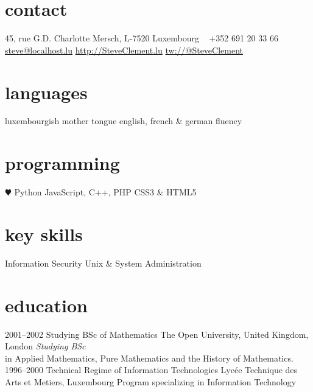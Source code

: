 \documentclass[]{friggeri-cv} %
\begin{document}


\begin{aside} %
\section{contact}
45, rue G.D. Charlotte
Mersch, L-7520
Luxembourg
~
+352 691 20 33 66
~
\href{mailto:steve@localhost.lu}{steve@localhost.lu}
\href{http://www.SteveClement.lu}{http://SteveClement.lu}
\href{http://twitter.com/SteveClement}{tw://@SteveClement}
\section{languages}
luxembourgish mother tongue
english, french \& german fluency
\section{programming}
{\color{red} $\varheartsuit$} Python
JavaScript, C++, PHP
CSS3 \& HTML5
\section{key skills}
Information Security
Unix \& System Administration
\end{aside}


\section{education}

\begin{entrylist}
\entry
{2001--2002}
{Studying BSc {\normalfont of Mathematics}}
{The Open University, United Kingdom, London}
{\emph{Studying BSc} \\ in Applied Mathematics, Pure Mathematics and the History of Mathematics.}
\entry
{1996--2000}
{Technical Regime {\normalfont of Information Technologies}}
{Lyc\'{e}e Technique des Arts et Metiers, Luxembourg}
{Program specializing in Information Technology}

\end{entrylist}
\end{document}
